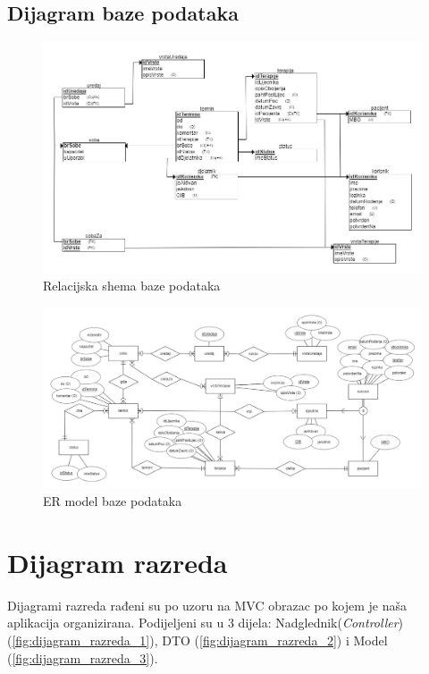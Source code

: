 			
			\subsection{Dijagram baze podataka}
		\begin{figure}[H]
			\includegraphics[width=\textwidth]{slike/Relacijska_shema_baze_podataka.JPG} %
			\caption{Relacijska shema baze podataka}
			\label{fig:relacijska_shema1} %
		\end{figure}
		
		\begin{figure}[H]
			\includegraphics[width=\textwidth]{slike/ER_model_baze_podataka.JPG} %
			\caption{ER model baze podataka}
			\label{fig:er_model} %
		\end{figure}
			
		\section{Dijagram razreda}
		
			Dijagrami razreda rađeni su po uzoru na MVC obrazac po kojem je naša aplikacija organizirana. Podijeljeni su u 3 dijela: Nadglednik(\textit{Controller}) (\ref{fig:dijagram_razreda_1}), DTO (\ref{fig:dijagram_razreda_2}) i Model (\ref{fig:dijagram_razreda_3}).
			
